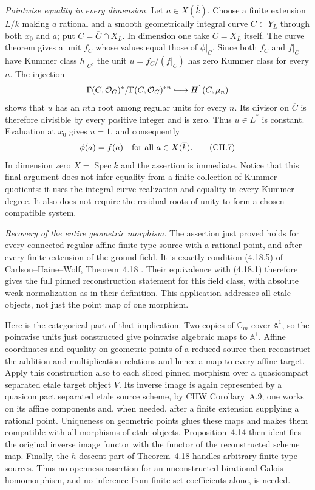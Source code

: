 \emph{Pointwise equality in every dimension.}
Let $a\in X(\overline k)$. Choose a finite extension $L/k$ making
$a$ rational and a smooth geometrically integral curve
$\overline C\subset Y_L$ through both $x_0$ and $a$; put
$C=\overline C\cap X_L$. In dimension one take $C=X_L$ itself.
The curve theorem gives a unit $f_C$ whose values equal those of
$\phi|_C$. Since both $f_C$ and $f|_C$ have Kummer class $h|_C$,
the unit $u=f_C/(f|_C)$ has zero Kummer class for every $n$. The
injection
\[
  \Gamma(C,\mathcal O_C)^*/\Gamma(C,\mathcal O_C)^{*n}
       \lhook\joinrel\longrightarrow H^1(C,\mu_n)
\]
shows that $u$ has an $n$th root among regular units for every $n$.
Its divisor on $\overline C$ is therefore divisible by every positive
integer and is zero. Thus $u\in L^*$ is constant. Evaluation at
$x_0$ gives $u=1$, and consequently
\[
                         \phi(a)=f(a)
                  \quad\hbox{for all }a\in X(\overline k).
                                                               \tag{CH.7}
\]
In dimension zero $X=\operatorname{Spec}k$ and the assertion is
immediate. Notice that this final argument does not infer equality
from a finite collection of Kummer quotients: it uses the integral
curve realization and equality in every Kummer degree. It also does
not require the residual roots of unity to form a chosen compatible
system.

\emph{Recovery of the entire geometric morphism.}
The assertion just proved holds for every connected regular affine
finite-type source with a rational point, and after every finite
extension of the ground field. It is exactly condition (4.18.5) of
Carlson--Haine--Wolf, Theorem~4.18 \cite{CHW2024}. Their equivalence
with (4.18.1) therefore gives the full pinned reconstruction statement
for this field class, with absolute weak normalization as in their
definition. This application addresses all etale objects, not just
the point map of one morphism.

Here is the categorical part of that implication. Two copies of
$\mathbb G_m$ cover $\mathbb A^1$, so the pointwise units just
constructed give pointwise algebraic maps to $\mathbb A^1$. Affine
coordinates and equality on geometric points of a reduced source
then reconstruct the addition and multiplication relations and hence
a map to every affine target. Apply this construction also to each
sliced pinned morphism over a quasicompact separated etale target
object $V$. Its inverse image is again represented by a
quasicompact separated etale source scheme, by CHW Corollary~A.9;
one works on its affine components and, when needed, after a finite
extension supplying a rational point. Uniqueness on geometric points
glues these maps and makes them compatible with all morphisms of
etale objects. Proposition~4.14 then identifies the original inverse
image functor with the functor of the reconstructed scheme map.
Finally, the $h$-descent part of Theorem~4.18 handles arbitrary
finite-type sources. Thus no openness assertion for an unconstructed
birational Galois homomorphism, and no inference from finite set
coefficients alone, is needed.
